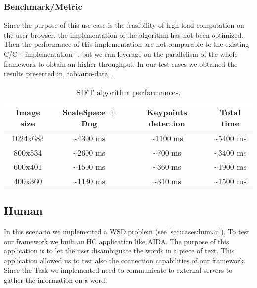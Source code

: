 \subsubsection{Benchmark/Metric}
Since the purpose of this use-case is the feasibility of high load computation
on the user browser, the implementation of the algorithm has not been optimized.
Then the performance of this implementation are not comparable to the existing
C/C+ implementation+, but we can leverage on the parallelism of the whole
framework to obtain an higher throughput. In our test cases we obtained the
results presented in \autoref{tab:auto-data}.
\begin{table}[htb]
    \caption{\acs{SIFT} algorithm performances.}
    \label{tab:auto-data}
    \centering
    \begin{tabular}{c|c|c|c}
        \textbf{Image size} & \textbf{ScaleSpace + Dog} & \textbf{Keypoints
        detection} & \textbf{Total time}\\
        \hline
        1024x683 & \textasciitilde{}4300 ms & \textasciitilde{}1100 ms & \textasciitilde{}5400 ms\\
        \hline
        800x534 & \textasciitilde{}2600 ms & \textasciitilde{}700 ms & \textasciitilde{}3400 ms\\
        \hline
        600x401 & \textasciitilde{}1500 ms & \textasciitilde{}360 ms & \textasciitilde{}1900 ms\\
        \hline
        400x360 & \textasciitilde{}1130 ms & \textasciitilde{}310 ms & \textasciitilde{}1500 ms\\
        \hline
    \end{tabular}
\end{table}

















\subsection{Human}
In this scenario we implemented a \acf{WSD} problem (see \ref{sec:cases:human}).
To test our framework we built an \acl{HC} application like AIDA. The purpose of
this application is to let the user disambiguate the words in a piece of text.
This application allowed us to test also the connection capabilities of our
framework. Since the Task we implemented need to communicate to external servers
to gather the information on a word.

